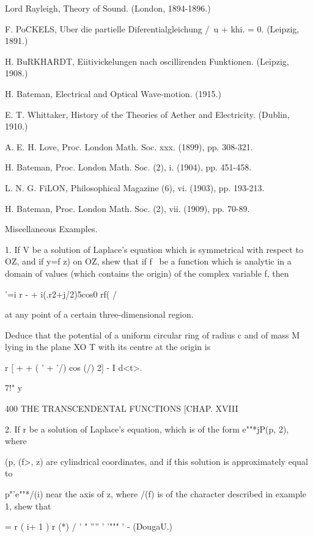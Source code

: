 Lord Rayleigh, Theory of Sound. (London, 1894-1896.) 

F. PoCKELS, Uber die partielle Diferentialgleichung /\ u + khi. = 0. (Leipzig, 1891.) 

H. BuRKHARDT, Eiitivickelungen nach oscillirenden Funktionen. (Leipzig, 1908.) 

H. Bateman, Electrical and Optical Wave-motion. (1915.) 

E. T. Whittaker, History of the Theories of Aether and Electricity. (Dublin, 1910.) 

A. E. H. Love, Proc. London Math. Soc. xxx. (1899), pp. 308-321. 

H. Bateman, Proc. London Math. Soc. (2), i. (1904), pp. 451-458. 

L. N. G. FiLON, Philosophical Magazine (6), vi. (1903), pp. 193-213. 

H. Bateman, Proc. London Math. Soc. (2), vii. (1909), pp. 70-89. 

Miscellaneous Examples. 

1. If V be a solution of Laplace's equation which is symmetrical with respect to OZ, 
and if y=f z) on OZ, shew that if f  \ be a function which is analytic in a domain of 
values (which contains the origin) of the complex variable f, then 



'=i r -   + i(.r2+j/2)5cos0 rf(  
  / 



at any point of a certain three-dimensional region. 

Deduce that the potential of a uniform circular ring of radius c and of mass M lying in 
the plane XO T with its centre at the origin is 



  r [  +    +   ( ' + '/)  cos (/) 2] - I d<t>. 

7!" y 



400 THE TRANSCENDENTAL FUNCTIONS [CHAP. XVIII 

2. If r be a solution of Laplace's equation, which is of the form e""*jP(p, 2), where 

(p, (f>, z) are cylindrical coordinates, and if this solution is approximately equal to 

p"'e""*/(i) near the axis of z, where /(f) is of the character described in example 1, 
shew that 



 = r ( i+ 1 ) r (*) /  ' "   ''''  ' '"""  ' - (DougaU.) 




